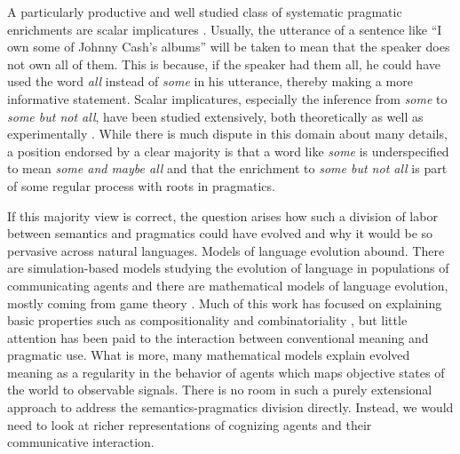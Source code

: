 \documentclass[a4paper]{article}
\begin{document}
A particularly productive and well studied class of systematic pragmatic enrichments are scalar
implicatures
\citep{horn:1984,Hirschberg1985:A-Theory-of-Sca,LevinsonPragmatics1983,Geurts2010:Quantity-Implic}. Usually,
the utterance of a sentence like ``I own some of Johnny Cash's albums'' will be taken to mean
that the speaker does not own all of them. This is because, if the speaker had them all, he
could have used the word \emph{all} instead of \emph{some} in his utterance, 
thereby making a more informative statement. Scalar implicatures, especially the
inference from \emph{some} to \emph{some but not all}, have been studied extensively, both
theoretically
\citep[e.g.,][]{Sauerland2004:Scalar-Implicat,ChierchiaFox2008:The-Grammatical,Rooyvan-RooijJagerde-Jager2012:Explaining-Quan}
as well as experimentally
\citep[e.g.,][]{BottNoveck2004:Some-Utterances,huang+snedeker:2009,GrodnerKlein2010:Some-and-Possib,GoodmanStuhlmuller2013:Knowledge-and-I,DegenTanenhaus2012:Processing-Scal}. While
there is much dispute in this domain about many details, a position endorsed by a
clear majority is that a word like \emph{some} is underspecified to mean \emph{some and maybe
  all} and that the enrichment to \emph{some but not all} is part of some regular 
process with roots in pragmatics.

If this majority view is correct, the question arises how such a division of labor between
semantics and pragmatics could have evolved and why it would be so pervasive across natural languages. Models of language evolution abound. There are
simulation-based models studying the evolution of language in populations of communicating
agents
\citep{Hurford1989:Biological-Evol,Steels1995:A-Self-Organizi,LenaertsJansen2005:The-Evolutionar,SteelsBelpaeme2005:Coordinating-Pe,BaronchelliPuglisi2008:Cultural-route-,steels:2011,SpikeStadler2016:Minimal-Require}
and there are mathematical models of language evolution, mostly coming from game theory
\citep{lewis:1969,Warneryd1993:Cheap-Talk-Coor,BlumeKim1993:Evolutionary-St,nowak+krakauer:1999,Huttegger2007:Evolution-and-t,Skyrms2010:Signals}. Much of this work has focused on explaining basic properties such as compositionality and combinatoriality
\citep[e.g.,][]{Batali1998:Computational-S,nowak+krakauer:1999,nowak+etal:2000,KirbyHurford2002:The-Emergence-o,kirby:2002,SmithKirby2003:Iterated-Learni,Gong2007:Language-Evolut,kirby+etal:2015,verhoef+etal:2014,Franke2015:Proto-Syntax}, but
little attention has been paid to the interaction between conventional meaning and pragmatic
use. What is more, many mathematical models explain evolved meaning as a regularity in the
behavior of agents which maps objective states of the world to observable signals. There is no
room in such a purely extensional approach to address the semantics-pragmatics division
directly. Instead, we would need to look at richer representations of cognizing agents and their
communicative interaction.
\end{document}
